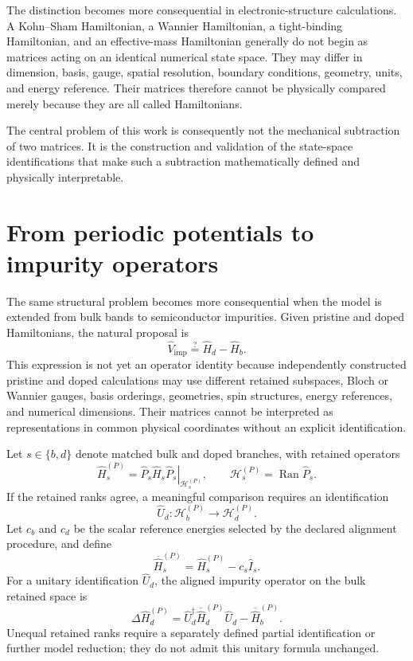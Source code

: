 The distinction becomes more consequential in electronic-structure
calculations. A Kohn--Sham Hamiltonian, a Wannier Hamiltonian, a tight-binding
Hamiltonian, and an effective-mass Hamiltonian generally do not begin as
matrices acting on an identical numerical state space. They may differ in
dimension, basis, gauge, spatial resolution, boundary conditions, geometry,
units, and energy reference. Their matrices therefore cannot be physically
compared merely because they are all called Hamiltonians.

The central problem of this work is consequently not the mechanical
subtraction of two matrices. It is the construction and validation of the
state-space identifications that make such a subtraction mathematically
defined and physically interpretable.

\section{From periodic potentials to impurity operators}

The same structural problem becomes more consequential when the model is
extended from bulk bands to semiconductor impurities. Given pristine and doped
Hamiltonians, the natural proposal is
\begin{equation}
    \hat V_{\mathrm{imp}}
    \stackrel{?}{=}
    \hat H_d-\hat H_b.
\end{equation}
This expression is not yet an operator identity because independently
constructed pristine and doped calculations may use different retained
subspaces, Bloch or Wannier gauges, basis orderings, geometries, spin
structures, energy references, and numerical dimensions. Their matrices cannot
be interpreted as representations in common physical coordinates without an
explicit identification.

Let $s\in\{b,d\}$ denote matched bulk and doped branches, with retained
operators
\begin{equation}
    \hat H_s^{(P)}
    =
    \left.
        \hat P_s\hat H_s\hat P_s
    \right|_{\mathcal H_s^{(P)}},
    \qquad
    \mathcal H_s^{(P)}
    =
    \operatorname{Ran}\hat P_s.
\end{equation}
If the retained ranks agree, a meaningful comparison requires an
identification
\begin{equation}
    \hat U_d:
    \mathcal H_b^{(P)}
    \longrightarrow
    \mathcal H_d^{(P)}.
\end{equation}
Let $c_b$ and $c_d$ be the scalar reference energies selected by the declared
alignment procedure, and define
\begin{equation}
    \overline{\hat H}_s^{(P)}
    =
    \hat H_s^{(P)}-c_s\hat I_s.
\end{equation}
For a unitary identification $\hat U_d$, the aligned impurity operator on the
bulk retained space is
\begin{equation}
    \Delta\hat H_d^{(P)}
    =
    \hat U_d^\dagger
    \overline{\hat H}_d^{(P)}
    \hat U_d
    -
    \overline{\hat H}_b^{(P)}.
\end{equation}
Unequal retained ranks require a separately defined partial identification or
further model reduction; they do not admit this unitary formula unchanged.

